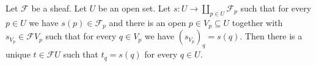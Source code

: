 Let $\mathcal{F}$ be a sheaf. Let $U$ be an open set.
Let $s\colon U\to\coprod_{p \in U} \mathcal{F}_p$ such that
for every $p \in U$ we have $s(p) \in \mathcal{F}_p$ and there is an open
$p \in V_p \subseteq U$ together with $s_{V_p} \in \mathcal{F}V_p$ such that
for every $q \in V_p$ we have $(s_{V_p})_q = s(q)$. Then there is a unique
$t \in \mathcal{F}U$ such that $t_q = s(q)$ for every $q \in U$.
